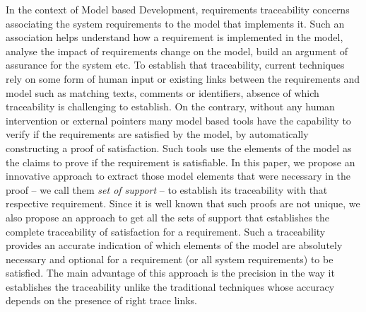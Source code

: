 In the context of Model based Development, requirements traceability concerns associating the system requirements to the model that implements it. Such an association helps understand how a requirement is implemented in the model, analyse the impact of requirements change on the model, build an argument of assurance for the system etc. To establish that traceability, current techniques rely on some form of human input or existing links between the requirements and model such as matching texts, comments or identifiers, absence of which traceability is challenging to establish. On the contrary, without any human intervention or external pointers many model based tools have the capability to verify if the requirements are satisfied by the model, by automatically constructing a proof of satisfaction. Such tools use the elements of the model as the claims to prove if the requirement is satisfiable. In this paper, we propose an innovative approach to extract those model elements that were necessary in the proof -- we call them \emph{set of support} -- to establish its traceability with that respective requirement. Since it is well known that such proofs are not unique, we also propose an approach to get all the sets of support that establishes the complete traceability of satisfaction for a requirement. Such a traceability provides an accurate indication of which elements of the model are absolutely necessary and optional for a requirement (or all system requirements) to be satisfied. The main advantage of this approach is the precision in the way it establishes the traceability unlike the traditional techniques whose accuracy depends on the presence of right trace links.

